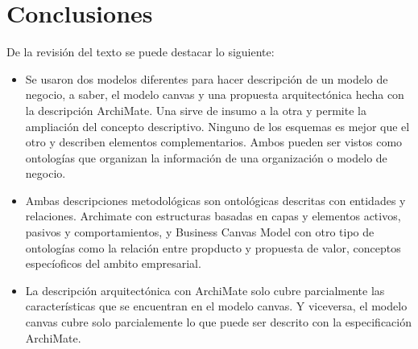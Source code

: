 
\chapter{Conclusiones}

De la revisión del texto se puede destacar lo siguiente: 

\begin{itemize}
    \item Se usaron dos modelos diferentes para hacer descripción de un modelo de negocio, a saber, el modelo canvas y una propuesta arquitectónica hecha con la descripción ArchiMate. Una sirve de insumo a la otra y permite la ampliación del concepto descriptivo. Ninguno de los esquemas es mejor que el otro y describen elementos complementarios. Ambos pueden ser vistos como ontologías que organizan la información de una organización o modelo de negocio.
    
    \item Ambas descripciones metodológicas son ontológicas descritas con entidades y relaciones. Archimate con estructuras basadas en capas y elementos activos, pasivos y comportamientos, y Business Canvas Model con otro tipo de ontologías como la relación entre propducto y propuesta de valor, conceptos especíoficos del ambito empresarial.
    
    \item La descripción arquitectónica con ArchiMate solo cubre parcialmente las características que se encuentran en el modelo canvas. Y viceversa, el modelo canvas cubre solo parcialemente lo que puede ser descrito con la especificación ArchiMate.
    
\end{itemize}